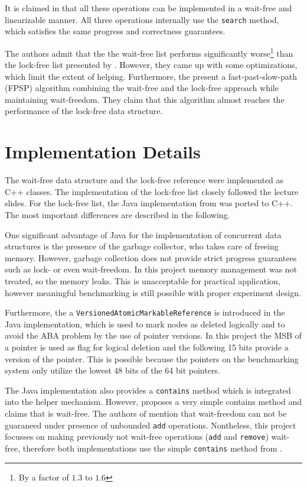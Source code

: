 \documentclass[a4paper, 12pt]{article}
\begin{document}
It is claimed in \cite{timnat12} that all these operations can be implemented in a wait-free and linearizable manner. All three operations internally use the \verb|search| method, which satisfies the same progress and correctness guarantees.

The authors admit that the the wait-free list performs significantly worse\footnote{By a factor of $1.3$ to $1.6$} than the lock-free list presented by \cite{harris01}. However, they came up with some optimizations, which limit the extent of helping. Furthermore, the present a fast-past-slow-path (FPSP) algorithm combining the wait-free and the lock-free approach while maintaining wait-freedom. They claim that this algorithm almost reaches the performance of the lock-free data structure. 


\section{Implementation Details}

The wait-free data structure and the lock-free reference were implemented as C++ classes. The implementation of the lock-free list closely followed the lecture slides. For the lock-free list, the Java implementation from \cite{timnat12} was ported to C++. The most important differences are described in the following.

One significant advantage of Java for the implementation of concurrent data structures is the presence of the garbage collector, who takes care of freeing memory. However, garbage collection does not provide strict progress guarantees such as lock- or even wait-freedom. In this project memory management was not treated, so the memory leaks. This is unacceptable for practical application, however meaningful benchmarking is still possible with proper experiment design.

Furthermore, the a \verb|VersionedAtomicMarkableReference| is introduced in the Java implementation, which is used to mark nodes as deleted logically and to avoid the ABA problem by the use of pointer versions. In this project the MSB of a pointer is used as flag for logical deletion and the following 15 bits provide a version of the pointer. This is possible because the pointers on the benchmarking system only utilize the lowest 48 bits of the 64 bit pointers.

The Java implementation also provides a \verb|contains| method which is integrated into the helper mechanism. However, \cite{herlihy12} proposes a very simple contains method and claims that is wait-free. The authors of \cite{timnat12} mention that wait-freedom can not be guaraneed under presence of unbounded \verb|add| operations. Nontheless, this project focusses on making previously not wait-free operations (\verb|add| and \verb|remove|) wait-free, therefore both implementations use the simple \verb|contains| method from \cite{herlihy12}.
\end{document}

